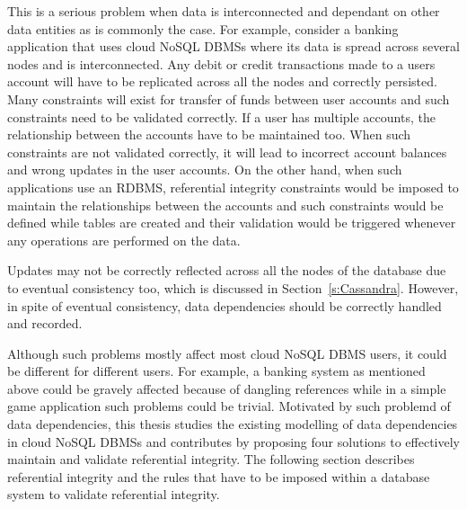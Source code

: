 This is a serious problem when data is interconnected and dependant on other
data entities as is commonly the case.  For example,   consider a banking
application that uses cloud \ac{NoSQL} \acp{DBMS} where its data is spread
across several nodes and is interconnected.  Any debit or credit transactions
made to a users account will have to be replicated across all the
nodes and correctly persisted.  Many constraints will exist for transfer of funds
between user accounts and such constraints need to be validated correctly.  If a
user has multiple accounts,   the relationship between the accounts have to be
maintained too.  When such constraints are not validated correctly,   it will lead
to incorrect account balances and wrong updates in the user accounts.  On the
other hand,   when such applications use an \ac{RDBMS},   referential integrity
constraints would be imposed to maintain the relationships between the accounts
and such constraints would be defined while tables are created and their
validation would be triggered whenever any operations are performed on the data.

Updates may not be correctly reflected across all the nodes of the database due
to  eventual consistency too,   which is discussed in Section~\ref{s:Cassandra}.
However, in spite of eventual consistency,   data dependencies should be
correctly handled and recorded.

Although such problems mostly affect most cloud \ac{NoSQL} \ac{DBMS} users,   it
could be different for different users.  For example, a banking system as
mentioned above could be gravely affected because of dangling references while
in a simple game application such problems could be trivial. 
Motivated by such
problemd of data dependencies, this thesis studies the existing modelling of
data dependencies in cloud \ac{NoSQL} \acp{DBMS} and contributes by proposing
four solutions to effectively maintain and validate referential integrity.
The following section describes referential integrity and the rules that have to
be imposed within a database system to validate referential integrity.

